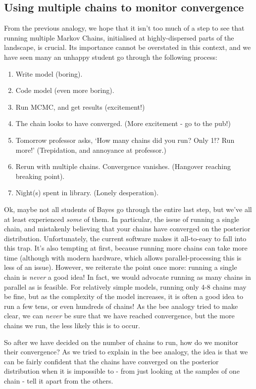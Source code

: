 \documentclass[11pt,fullpage]{book}
\begin{document}
\subsection{Using multiple chains to monitor convergence}
From the previous analogy, we hope that it isn't too much of a step to see that running multiple Markov Chains, initialised at highly-dispersed parts of the landscape, is crucial. Its importance cannot be overstated in this context, and we have seen many an unhappy student go through the following process:

\begin{enumerate}
\item Write model (boring).
\item Code model (even more boring).
\item Run MCMC, and get results (excitement!)
\item The chain looks to have converged. (More excitement - go to the pub!)
\item Tomorrow professor asks, `How many chains did you run? Only 1!? Run more!' (Trepidation, and annoyance at professor.)
\item Rerun with multiple chains. Convergence vanishes. (Hangover reaching breaking point).
\item Night(s) spent in library. (Lonely desperation).
\end{enumerate}

Ok, maybe not all students of Bayes go through the entire last step, but we've all at least experienced \textit{some} of them. In particular, the issue of running a single chain, and mistakenly believing that your chains have converged on the posterior distribution. Unfortunately, the current software makes it all-to-easy to fall into this trap. It's also tempting at first, because running more chains can take more time (although with modern hardware, which allows parallel-processing this is less of an issue). However, we reiterate the point once more: running a single chain is \textit{never} a good idea! In fact, we would advocate running as many chains in parallel as is feasible. For relatively simple models, running only 4-8 chains may be fine, but as the complexity of the model increases, it is often a good idea to run a few tens, or even hundreds of chains! As the bee analogy tried to make clear, we can \textit{never} be sure that we have reached convergence, but the more chains we run, the less likely this is to occur.

So after we have decided on the number of chains to run, how do we monitor their convergence? As we tried to explain in the bee analogy, the idea is that we can be fairly confident that the chains have converged on the posterior distribution when it is impossible to - from just looking at the samples of one chain - tell it apart from the others. 
\end{document}
